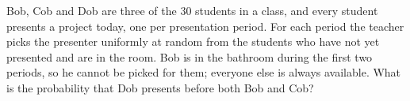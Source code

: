 Bob, Cob and Dob are three of the $30$ students in a class, and every student presents a project today, one per presentation period. For each period the teacher picks the presenter uniformly at random from the students who have not yet presented and are in the room. Bob is in the bathroom during the first two periods, so he cannot be picked for them; everyone else is always available. What is the probability that Dob presents before both Bob and Cob?
